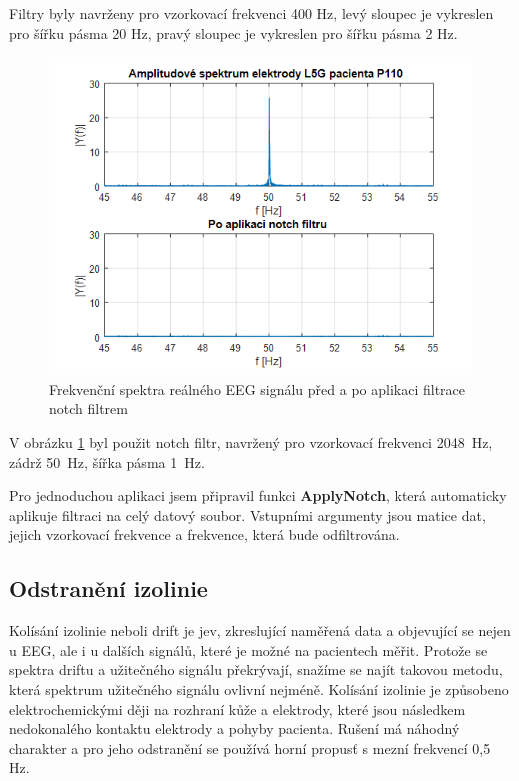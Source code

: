 \newpage
Filtry byly navrženy pro vzorkovací frekvenci 400 Hz, levý sloupec je vykreslen pro šířku pásma 20 Hz, pravý sloupec je vykreslen pro šířku pásma 2 Hz.

\begin{figure}[!h]
\includegraphics[width=1.0\textwidth]{casti/implementace/notch/aplikace.png}
\caption{Frekvenční spektra reálného EEG signálu před a po aplikaci filtrace notch filtrem}
\label{aplikacedrift}
\end{figure}

V obrázku \ref{aplikacedrift} byl použit notch filtr, navržený pro vzorkovací frekvenci 2048~Hz, zádrž 50~Hz, šířka pásma 1~Hz.

Pro jednoduchou aplikaci jsem připravil funkci \textbf{ApplyNotch}, která automaticky aplikuje filtraci na celý datový soubor. Vstupními argumenty jsou matice dat, jejich vzorkovací frekvence a frekvence, která bude odfiltrována.


\subsection{Odstranění izolinie}
Kolísání izolinie neboli drift je jev, zkreslující naměřená data a objevující se nejen u EEG, ale i u dalších signálů, které je možné na pacientech měřit. Protože se spektra driftu a užitečného signálu překrývají, snažíme se najít takovou metodu, která spektrum užitečného signálu ovlivní nejméně. Kolísání izolinie je způsobeno elektrochemickými ději na rozhraní kůže a elektrody, které jsou následkem nedokonalého kontaktu elektrody a pohyby pacienta. Rušení má náhodný charakter a pro jeho odstranění se používá horní propusť s mezní frekvencí 0,5 Hz. \cite{65,66}

